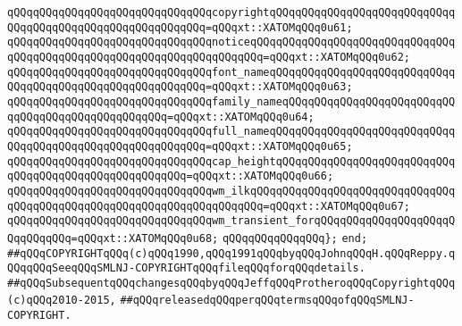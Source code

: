 \verb|qQQqqQQqqQQqqQQqqQQqqQQqqQQqqQQqcopyrightqQQqqQQqqQQqqQQqqQQqqQQqqQQqqQQqqQQqqQQqqQQqqQQqqQQqqQQqqQQq=qQQqxt::XATOMqQQq0u61;|\newline
\verb|qQQqqQQqqQQqqQQqqQQqqQQqqQQqqQQqnoticeqQQqqQQqqQQqqQQqqQQqqQQqqQQqqQQqqQQqqQQqqQQqqQQqqQQqqQQqqQQqqQQqqQQqqQQq=qQQqxt::XATOMqQQq0u62;|\newline
\verb|qQQqqQQqqQQqqQQqqQQqqQQqqQQqqQQqfont_nameqQQqqQQqqQQqqQQqqQQqqQQqqQQqqQQqqQQqqQQqqQQqqQQqqQQqqQQqqQQq=qQQqxt::XATOMqQQq0u63;|\newline
\verb|qQQqqQQqqQQqqQQqqQQqqQQqqQQqqQQqfamily_nameqQQqqQQqqQQqqQQqqQQqqQQqqQQqqQQqqQQqqQQqqQQqqQQqqQQq=qQQqxt::XATOMqQQq0u64;|\newline
\verb|qQQqqQQqqQQqqQQqqQQqqQQqqQQqqQQqfull_nameqQQqqQQqqQQqqQQqqQQqqQQqqQQqqQQqqQQqqQQqqQQqqQQqqQQqqQQqqQQq=qQQqxt::XATOMqQQq0u65;|\newline
\verb|qQQqqQQqqQQqqQQqqQQqqQQqqQQqqQQqcap_heightqQQqqQQqqQQqqQQqqQQqqQQqqQQqqQQqqQQqqQQqqQQqqQQqqQQqqQQq=qQQqxt::XATOMqQQq0u66;|\newline
\verb|qQQqqQQqqQQqqQQqqQQqqQQqqQQqqQQqwm_ilkqQQqqQQqqQQqqQQqqQQqqQQqqQQqqQQqqQQqqQQqqQQqqQQqqQQqqQQqqQQqqQQqqQQqqQQq=qQQqxt::XATOMqQQq0u67;|\newline
\verb|qQQqqQQqqQQqqQQqqQQqqQQqqQQqqQQqwm_transient_forqQQqqQQqqQQqqQQqqQQqqQQqqQQqqQQq=qQQqxt::XATOMqQQq0u68;|\newline
\verb|qQQqqQQqqQQqqQQq};|\newline
\verb|end;|\newline
\newline
\verb|##qQQqCOPYRIGHTqQQq(c)qQQq1990,qQQq1991qQQqbyqQQqJohnqQQqH.qQQqReppy.qQQqqQQqSeeqQQqSMLNJ-COPYRIGHTqQQqfileqQQqforqQQqdetails.|\newline
\verb|##qQQqSubsequentqQQqchangesqQQqbyqQQqJeffqQQqProtheroqQQqCopyrightqQQq(c)qQQq2010-2015,|\newline
\verb|##qQQqreleasedqQQqperqQQqtermsqQQqofqQQqSMLNJ-COPYRIGHT.|\newline

